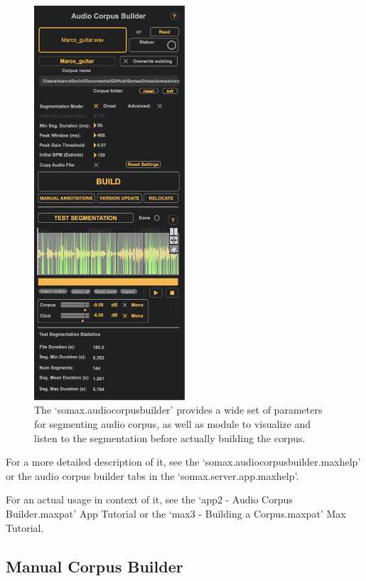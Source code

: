  \begin{figure}[H]
    \centering        
 	\includegraphics[width=0.5\textwidth, keepaspectratio]{img/audiocorpusbuilder.png}
    \caption{The `somax.audiocorpusbuilder' provides a wide set of parameters for segmenting audio corpus, as well as module to visualize and listen to the segmentation before actually building the corpus.}
    \label{fig:audiocorpusbuilder}
\end{figure}

For a more detailed description of it, see the `somax.audiocorpusbuilder.maxhelp' or the audio corpus builder tabs in the `somax.server.app.maxhelp'.

For an actual usage in context of it, see the `app2 - Audio Corpus Builder.maxpat' App Tutorial or the `max3 - Building a Corpus.maxpat' Max Tutorial.

\subsection{Manual Corpus Builder}

